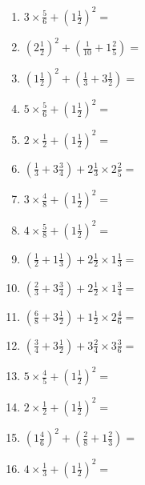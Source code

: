 \documentclass[12pt]{article}
\begin{document}
\begin{enumerate}
\item \large $ 3 \times \frac{5}{6} + (1 \frac{1}{2})^2 = $ \vspace{1.8cm}
\item \large $ (2 \frac{1}{2})^2 + (\frac{1}{10} + 1 \frac{2}{5}) = $ \vspace{1.8cm}
\item \large $ (1 \frac{1}{2})^2 + (\frac{1}{3} + 3 \frac{1}{2}) = $ \vspace{1.8cm}
\item \large $ 5 \times \frac{5}{6} + (1 \frac{1}{2})^2 = $ \vspace{1.8cm}
\item \large $ 2 \times \frac{1}{2} + (1 \frac{1}{2})^2 = $ \vspace{1.8cm}
\item \large $ (\frac{1}{3} + 3 \frac{3}{4}) + 2 \frac{1}{3} \times 2 \frac{2}{5} = $ \vspace{1.8cm}
\newpage
\item \large $ 3 \times \frac{4}{8} + (1 \frac{1}{2})^2 = $ \vspace{1.8cm}
\item \large $ 4 \times \frac{5}{8} + (1 \frac{1}{2})^2 = $ \vspace{1.8cm}
\item \large $ (\frac{1}{2} + 1 \frac{1}{3}) + 2 \frac{1}{2} \times 1 \frac{1}{3} = $ \vspace{1.8cm}
\item \large $ (\frac{2}{3} + 3 \frac{3}{4}) + 2 \frac{1}{2} \times 1 \frac{3}{4} = $ \vspace{1.8cm}
\item \large $ (\frac{6}{8} + 3 \frac{1}{2}) + 1 \frac{1}{2} \times 2 \frac{4}{6} = $ \vspace{1.8cm}
\item \large $ (\frac{3}{4} + 3 \frac{1}{2}) + 3 \frac{2}{4} \times 3 \frac{3}{6} = $ \vspace{1.8cm}
\item \large $ 5 \times \frac{4}{5} + (1 \frac{1}{2})^2 = $ \vspace{1.8cm}
\item \large $ 2 \times \frac{1}{2} + (1 \frac{1}{2})^2 = $ \vspace{1.8cm}
\item \large $ (1 \frac{4}{6})^2 + (\frac{2}{8} + 1 \frac{2}{3}) = $ \vspace{1.8cm}
\item \large $ 4 \times \frac{1}{3} + (1 \frac{1}{2})^2 = $ \vspace{1.8cm}

\end{enumerate}
\end{document}
